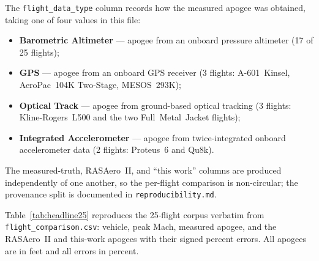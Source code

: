 The \texttt{flight\_data\_type} column records how the measured apogee was
obtained, taking one of four values in this file:
\begin{itemize}
  \item \textbf{Barometric Altimeter} --- apogee from an onboard pressure
        altimeter (17 of 25 flights);
  \item \textbf{GPS} --- apogee from an onboard GPS receiver (3 flights:
        A-601~Kinsel, AeroPac~104K Two-Stage, MESOS~293K);
  \item \textbf{Optical Track} --- apogee from ground-based optical tracking
        (3 flights: Kline-Rogers~L500 and the two Full~Metal~Jacket flights);
  \item \textbf{Integrated Accelerometer} --- apogee from twice-integrated
        onboard accelerometer data (2 flights: Proteus~6 and Qu8k).
\end{itemize}
The measured-truth, RASAero~II, and ``this work'' columns are produced
independently of one another, so the per-flight comparison is non-circular;
the provenance split is documented in \texttt{reproducibility.md}.

Table~\ref{tab:headline25} reproduces the 25-flight corpus verbatim from
\texttt{flight\_comparison.csv}: vehicle, peak Mach, measured apogee, and the
RASAero~II and this-work apogees with their signed percent errors. All apogees
are in feet and all errors in percent.

